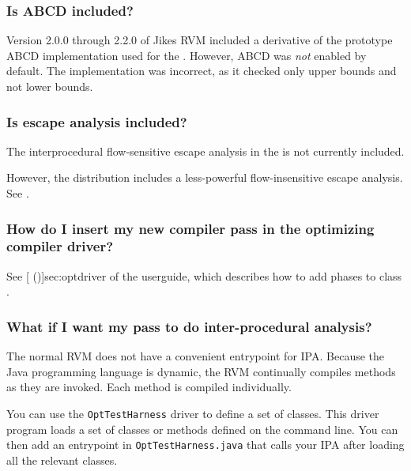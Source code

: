 \subsubsection{Is ABCD included?}
Version 2.0.0 through 2.2.0 of Jikes RVM included a derivative of the
prototype ABCD implementation used for the .  However, ABCD was {\em not} enabled by default.
The implementation was incorrect, as it checked only upper
bounds and not lower bounds. 

\subsubsection{Is escape analysis included?}

The interprocedural flow-sensitive escape analysis in the 
 is not currently included.

However, the distribution includes a less-powerful flow-insensitive
escape analysis.  See  
.

\subsubsection{How do I insert my new compiler pass in the optimizing
compiler driver?}

See [ (\Ref)]{sec:optdriver} of the userguide, which describes how to
add phases to class 
.

\subsubsection{What if I want my pass to do inter-procedural analysis?}

The normal RVM does not have a convenient entrypoint for IPA.  Because the
Java programming language is
dynamic, the RVM continually compiles methods as they are
invoked.  Each method is compiled individually.

You can use the {\tt OptTestHarness} driver to define a set of classes. 
This driver program loads a set of classes or methods defined on the
command line.  You can then add an entrypoint in {\tt OptTestHarness.java}
that calls your IPA after loading all the relevant classes.

